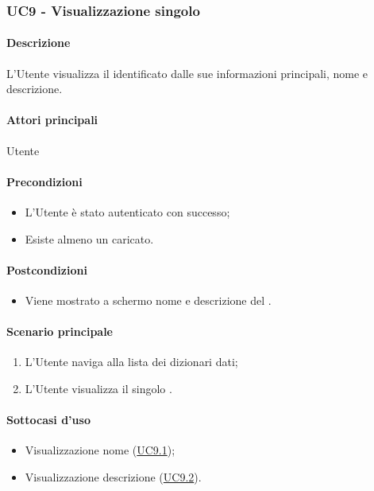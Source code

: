 \subsubsection{UC9 - Visualizzazione singolo }\label{UC9}
\paragraph*{Descrizione}
L’Utente visualizza il  identificato dalle sue informazioni principali, nome e descrizione.

\paragraph*{Attori principali}
Utente

\paragraph*{Precondizioni}
\begin{itemize}
  \item L’Utente è stato autenticato con successo;
  \item Esiste almeno un  caricato.  
\end{itemize}

\paragraph*{Postcondizioni}
\begin{itemize}
  \item Viene mostrato a schermo nome e descrizione del .
\end{itemize}

\paragraph*{Scenario principale}
\begin{enumerate}
  \item L’Utente naviga alla lista dei dizionari dati;
  \item L’Utente visualizza il singolo .
\end{enumerate}

\paragraph*{Sottocasi d'uso}
\begin{itemize}
  \item Visualizzazione nome  (\hyperref[UC9point1]{UC9.1});
  \item Visualizzazione descrizione  (\hyperref[UC9point2]{UC9.2}).
\end{itemize}


